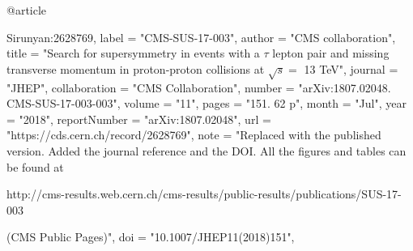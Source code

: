 @article{Sirunyan:2628769,
      label          = "CMS-SUS-17-003",
      author        = "{CMS collaboration}",
      title         = "{Search for supersymmetry in events with a $ \tau $ lepton
                       pair and missing transverse momentum in proton-proton
                       collisions at $\sqrt{s} = $ 13 TeV}",
      journal       = "JHEP",
      collaboration = "CMS Collaboration",
      number        = "arXiv:1807.02048. CMS-SUS-17-003-003",
      volume        = "11",
      pages         = "151. 62 p",
      month         = "Jul",
      year          = "2018",
      reportNumber  = "arXiv:1807.02048",
      url           = "https://cds.cern.ch/record/2628769",
      note          = "Replaced with the published version. Added the journal
                       reference and
  the DOI. All the figures and tables can be
                       found at
 
                       http://cms-results.web.cern.ch/cms-results/public-results/publications/SUS-17-003

                        (CMS Public Pages)",
      doi           = "10.1007/JHEP11(2018)151",
}


